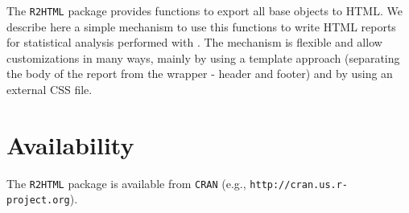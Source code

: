 \documentclass[a4paper]{article}
\newcommand{\HTML}{{\tt R2HTML}}
\begin{document}
The \HTML{} package provides functions to export all base \R{} objects to HTML. We describe here a simple mechanism to use this functions to write HTML reports for statistical analysis performed with \R{}. The mechanism is flexible and allow customizations in many ways, mainly by using a template approach (separating the body of the report from the wrapper - header and footer) and by using an external CSS file.

\section*{Availability}

The \HTML{} package is available from \verb+CRAN+ (e.g., {\tt http://cran.us.r-project.org}).




\address{Eric Lecoutre\\
Institut de statistique, UCL, Belgium\\
}
\end{document}

